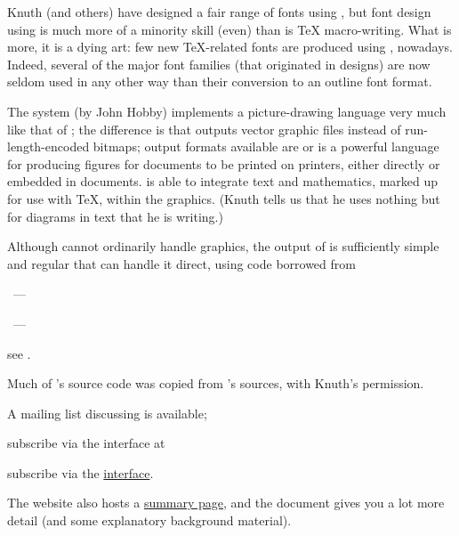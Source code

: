Knuth (and others) have designed a fair range of fonts using \MF{},
but font design using \MF{} is much more of a minority skill (even) than is
\TeX{} macro-writing.
What is more, it is a dying art: few new \TeX{}-related fonts are
produced using \MF{}, nowadays.  Indeed, several of the major font
families (that originated in \MF{} designs) are now seldom used in any
other way than their conversion to an outline font format.


The \MP{} system (by John Hobby) implements a picture-drawing language
very much like that of \MF{}; the difference is that \MP{} outputs
vector graphic files instead of run-length-encoded bitmaps; output
formats available are \PS{} or 
\MP{}
is a powerful language for producing figures for documents to be
printed on \PS{} printers, either directly or embedded in \AllTeX{}
documents.  \MP{} is able to integrate text and mathematics, marked up
for use with \TeX{}, within the graphics.  (Knuth tells us that he
uses nothing but \MP{} for diagrams in text that he is writing.)

Although \PDFLaTeX{} cannot ordinarily handle \PS{} graphics, the
output of \MP{} is sufficiently simple and regular that \PDFLaTeX{}
can handle it direct, using code borrowed from
\begin{hyperversion}
  ~---
\end{hyperversion}
\begin{flatversion}
  \context{}~---
\end{flatversion}
see .

Much of \MP{}'s source code was copied from \MF{}'s sources, with
Knuth's permission.

A mailing list discussing \MP{} is available;
\begin{flatversion}
  subscribe via the   interface at
\end{flatversion}
\begin{hyperversion}
  subscribe via the %
  \href{http://lists.tug.org/metapost}{  interface}.
\end{hyperversion}
The  website also hosts a %
\href{http://tug.org/metapost.html}{\MP{} summary page}, and the
 document gives you a lot more detail (and some
explanatory background material).
\begin{ctanrefs}
\item[tex-overview.pdf]
\end{ctanrefs}

